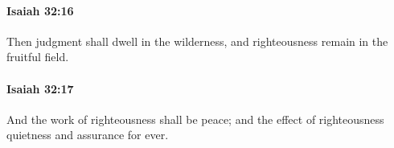 		\paragraph{Isaiah 32:16} %
			\label{ISAIAH-32-16}

			Then judgment shall dwell in the wilderness, and righteousness remain in the fruitful field.


		\paragraph{Isaiah 32:17} %
			\label{ISAIAH-32-17}

			And the work of righteousness shall be peace; and the effect of righteousness quietness and assurance for ever.


